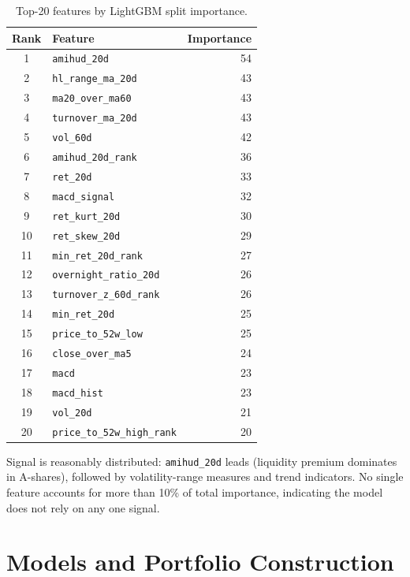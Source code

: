 \documentclass[11pt,a4paper]{article}
\begin{document}
\begin{table}[h]
\centering
\begin{tabular}{clr}
\toprule
Rank & Feature & Importance \\
\midrule
1  & \texttt{amihud\_20d}          & 54 \\
2  & \texttt{hl\_range\_ma\_20d}   & 43 \\
3  & \texttt{ma20\_over\_ma60}     & 43 \\
4  & \texttt{turnover\_ma\_20d}    & 43 \\
5  & \texttt{vol\_60d}             & 42 \\
6  & \texttt{amihud\_20d\_rank}    & 36 \\
7  & \texttt{ret\_20d}             & 33 \\
8  & \texttt{macd\_signal}         & 32 \\
9  & \texttt{ret\_kurt\_20d}       & 30 \\
10 & \texttt{ret\_skew\_20d}       & 29 \\
11 & \texttt{min\_ret\_20d\_rank}  & 27 \\
12 & \texttt{overnight\_ratio\_20d}& 26 \\
13 & \texttt{turnover\_z\_60d\_rank}& 26 \\
14 & \texttt{min\_ret\_20d}        & 25 \\
15 & \texttt{price\_to\_52w\_low}  & 25 \\
16 & \texttt{close\_over\_ma5}     & 24 \\
17 & \texttt{macd}                 & 23 \\
18 & \texttt{macd\_hist}           & 23 \\
19 & \texttt{vol\_20d}             & 21 \\
20 & \texttt{price\_to\_52w\_high\_rank} & 20 \\
\bottomrule
\end{tabular}
\caption{Top-20 features by LightGBM split importance.}
\label{tab:fimp}
\end{table}

Signal is reasonably distributed: \texttt{amihud\_20d} leads (liquidity
premium dominates in A-shares), followed by volatility-range measures and
trend indicators. No single feature accounts for more than 10\% of total
importance, indicating the model does not rely on any one signal.

\section{Models and Portfolio Construction}
\end{document}
